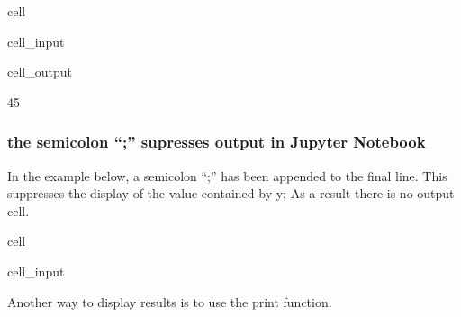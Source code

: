 \documentclass[letterpaper,10pt,english]{jupyterBook}
\begin{document}
\begin{sphinxuseclass}{cell}\begin{sphinxVerbatimInput}

\begin{sphinxuseclass}{cell_input}
\begin{sphinxVerbatim}[commandchars=\\\{\}]
  
  
\end{sphinxVerbatim}

\end{sphinxuseclass}\end{sphinxVerbatimInput}
\begin{sphinxVerbatimOutput}

\begin{sphinxuseclass}{cell_output}
\begin{sphinxVerbatim}[commandchars=\\\{\}]
45
\end{sphinxVerbatim}

\end{sphinxuseclass}\end{sphinxVerbatimOutput}

\end{sphinxuseclass}

\subsubsection{the semi\sphinxhyphen{}colon “;” supresses output in Jupyter Notebook}
\label{\detokenize{content/04_PythonEssentials/Intro_Jupyter_notebook:the-semi-colon-supresses-output-in-jupyter-notebook}}
\sphinxAtStartPar
In the example below, a semi\sphinxhyphen{}colon “;” has been appended to the final line.  This suppresses the display of the value contained by y;  As a result there is no output cell.

\begin{sphinxuseclass}{cell}\begin{sphinxVerbatimInput}

\begin{sphinxuseclass}{cell_input}
\begin{sphinxVerbatim}[commandchars=\\\{\}]
  
  
\end{sphinxVerbatim}

\end{sphinxuseclass}\end{sphinxVerbatimInput}

\end{sphinxuseclass}
\sphinxAtStartPar
Another way to display results is to use the print function.
\end{document}
